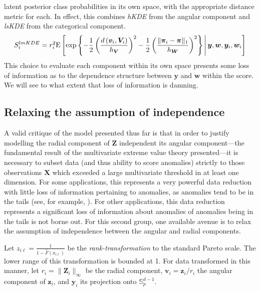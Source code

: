     latent posterior class probabilities in its own space, with the appropriate distance 
    metric for each.  In effect, this combines \emph{hKDE} from
    the angular component and \emph{lsKDE} from the categorical component.
    \[
    S_i^{lmKDE} = r_i^2 \text{E}\left[
        \exp
        \left\lbrace 
        -\frac{1}{2}
        \left(
        \frac{d\left(\bm{v}_i, \bm{V}_i\right)}{h_{\bm{V}}}
        \right)^2
        -\frac{1}{2}
        \left(
        \frac{\lVert\bm{\pi}_i - \bm{\pi}\rVert_1}{h_{\bm{W}}}
        \right)^2
        \right\rbrace
        \,\middle\vert\, \bm{y},\bm{w},\bm{y}_i,\bm{w}_i\right]
    \]
    This choice to evaluate each component within its own space presents some loss of 
    information as to the dependence structure between $\bm{y}$ and $\bm{w}$ within 
    the score.  We will see to what extent that loss of information is damning.

\subsection{Relaxing the assumption of independence\label{subsec:rank}}
A valid critique of the model presented thus far is that in order to justify modelling
    the radial component of $\bm{Z}$ independent its angular component---the fundamental
    result of the multivariate extreme value theory presented---it is necessary to subset
    data (and thus ability to score anomalies) strictly to those observations $\bm{X}$ 
    which exceeded a large multivariate threshold in at least one dimension.  For some 
    applications, this represents a very powerful data reduction with little loss of 
    information pertaining to anomalies, as anomalies tend to be in the tails (see, for
    example, ).  For other
    applications, this data reduction represents a significant loss of information about 
    anomalies of anomalies being in the tails is not borne out.  For this second group, 
    one available avenue is to relax the assumption of independence between the angular 
    and radial components.

Let $z_{i\ell} = \frac{1}{1 - \hat{F}(x_{i\ell})}$ be the \emph{rank-transformation} to
    the standard Pareto scale.  The lower range of this transformation is bounded at 1.
    For data transformed in this manner, let $r_i = \lVert \bm{Z}_i\rVert_{\infty}$ be the
    radial component, $\bm{v}_i = \bm{z}_i/r_i$ the angular component of $\bm{z}_i$,
    and $\bm{y}_i$ its projection onto $\mathbb{S}_p^{d-1}$.
    
